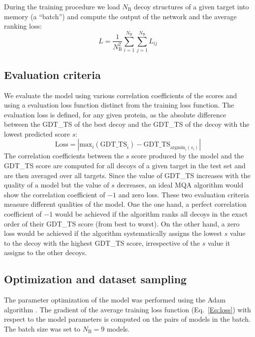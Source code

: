 \documentclass{bioinfo}
\begin{document}
During the training procedure we load $N_\text{B}$ decoy structures of
a given target into memory (a ``batch'') and compute the output of the
network and the average ranking loss:
\begin{equation}
L = \frac{1}{N_\text{B}^2} \sum_{i=1}^{N_\text{B}}\sum_{j=1}^{N_\text{B}} L_{ij}
\label{Eq:loss}
\end{equation}


\subsection{Evaluation criteria}

We evaluate the model using various correlation coefficients of the
scores and using a evaluation loss function distinct from the training loss
function. The evaluation loss is defined, for any given protein, as the
absolute difference between the GDT\_TS of the best decoy and the
GDT\_TS of the decoy with the lowest predicted score $s$:
\begin{equation}
\mathrm{Loss} = \left| \mathrm{max}_i(\text{GDT\_TS}_i) - \text{GDT\_TS}_{\mathrm{argmin}_i(s_i)} \right|
\label{Eq:eloss}
\end{equation}
The correlation coefficients between the $s$ score produced by the
model and the GDT\_TS score are computed for all decoys of a given
target in the test set and are then averaged over all targets. Since
the value of GDT\_TS increases with the quality of a model but the
value of $s$ decreases, an ideal MQA algorithm would show the correlation
coefficient of $-1$ and zero loss.
These two evaluation criteria measure different qualities of the
model. One the one hand, a perfect correlation coefficient of $-1$ would
be achieved if the algorithm ranks all decoys in the exact
order of their GDT\_TS score (from best to worst). On the other hand,
a zero loss would be achieved if the algorithm systematically assigns
the lowest $s$ value to the decoy with the highest GDT\_TS score,
irrespective of the $s$ value it assigns to the other decoys.


\subsection{Optimization and dataset sampling}

The parameter optimization of the model was performed using the Adam
algorithm \citep{kingma2014adam}. The gradient of the 
average training loss function (Eq.~\ref{Eq:loss})
with respect to the model parameters is computed on the pairs of
models in the batch. The batch size was set to $N_\text{B} = 9$
models.
\end{document}
